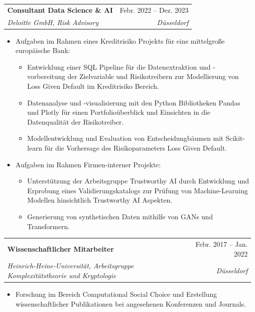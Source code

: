 \documentclass[letterpaper,11pt]{article}
\makeatletter
\newcommand{\resumeItem}[1]{
  \item\small{
    {#1 \vspace{-2pt}}
  }
}
\newcommand{\resumeSubheading}[4]{
  \vspace{-2pt}\item
    \begin{tabular*}{0.97\textwidth}[t]{l@{\extracolsep{\fill}}r}
      \textbf{#1} & #2 \\
      \textit{\small#3} & \textit{\small #4} \\
    \end{tabular*}\vspace{-7pt}
}
\newcommand{\resumeItemListStart}{\begin{itemize}}
\newcommand{\resumeItemListEnd}{\end{itemize}\vspace{-5pt}}
\makeatother
\begin{document}
    \resumeSubheading
      {Consultant Data Science \& AI}{Febr. 2022 -- Dez. 2023}
      {Deloitte GmbH, Risk Advisory}{D\"usseldorf}
      \resumeItemListStart
        \resumeItem{Aufgaben im Rahmen eines Kreditrisiko Projekts für eine mittelgro{\ss}e europ\"aische Bank:}
        \resumeItemListStart
        \resumeItem{Entwicklung einer SQL Pipeline f\"ur die Datenextraktion und -vorbereitung der Zielvariable und Risikotreibern zur Modellierung von Loss Given Default im Kreditrisiko Bereich.}
        \resumeItem{Datenanalyse und -visualisierung mit den Python Bibliotheken Pandas und Plotly f\"ur einen Portfolio\"uberblick und Einsichten in die Datenqualit\"at der Risikotreiber.}
        \resumeItem{Modellentwicklung und Evaluation von Entscheidungb\"aumen mit Scikit-learn für die Vorhersage des Risikoparameters Loss Given Default.}
        \resumeItemListEnd\vspace{5pt}
      \resumeItem{Aufgaben im Rahmen Firmen-interner Projekte:}
        \resumeItemListStart

        \resumeItem{Unterst\"utzung der Arbeitsgruppe \glqq Trustworthy AI\grqq{}  durch Entwicklung und Erprobung eines Validierungskatalogs zur Prüfung von Machine-Learning Modellen hinsichtlich Trustworthy AI Aspekten.}
        
        \resumeItem{Generierung von synthetischen Daten mithilfe von GANs und Transformern. 
        }
        \resumeItemListEnd
    \resumeItemListEnd\vspace{5pt}

    \resumeSubheading
      {Wissenschaftlicher Mitarbeiter}{Febr. 2017 -- Jan. 2022}
      {Heinrich-Heine-Universit\"at, Arbeitsgruppe Komplexit\"atstheorie und Kryptologie}{D\"usseldorf}
      \resumeItemListStart
        \resumeItem{Forschung im Bereich Computational Social Choice und Erstellung wissenschaftlicher Publikationen bei angesehenen Konferenzen und Journals.}
      \resumeItemListEnd
\end{document}
